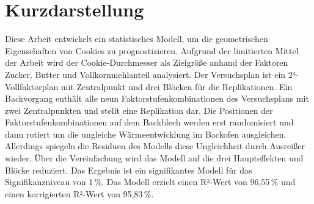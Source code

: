 \thispagestyle{empty}
\section*{Kurzdarstellung}
\label{sec:kurzdarstellung}

Diese Arbeit entwickelt ein statistisches Modell, um die geometrischen Eigenschaften von Cookies zu prognostizieren.
Aufgrund der limitierten Mittel der Arbeit wird der Cookie-Durchmesser als Zielgröße anhand der Faktoren Zucker, Butter und Vollkornmehlanteil analysiert.
Der Versuchsplan ist ein 2³-Vollfaktorplan mit Zentralpunkt und drei Blöcken für die Replikationen.
Ein Backvorgang enthält alle neun Faktorstufenkombinationen des Versuchsplans mit zwei Zentralpunkten und stellt eine Replikation dar.
Die Positionen der Faktorstufenkombinationen auf dem Backblech werden erst randomisiert und dann rotiert um die ungleiche Wärmeentwicklung im Backofen ausgleichen.
Allerdings spiegeln die Residuen des Modells diese Ungleichheit durch Ausreißer wieder.
Über die Vereinfachung wird das Modell auf die drei Haupteffekten und Blöcke reduziert.
Das Ergebnis ist ein signifikantes Modell für das Signifikanzniveau von 1\,\%. 
Das Modell erzielt einen R²-Wert von 96,55\,\% und einen korrigierten R²-Wert von 95,83\,\%.
